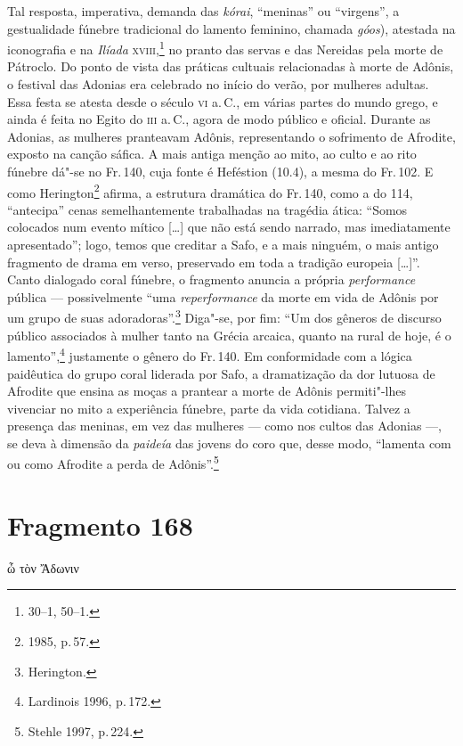 	
Tal resposta, imperativa, demanda das \emph{kórai}, ``meninas'' ou ``virgens'', a gestualidade fúnebre tradicional do lamento feminino, chamada \emph{góos}), atestada na iconografia e na \emph{Ilíada} \textsc{xviii},\footnote{30--1, 50--1.} no pranto das servas e das Nereidas pela morte de Pátroclo.
Do ponto de vista das práticas cultuais relacionadas à morte de Adônis, o festival das Adonias  
era celebrado no início do verão, por mulheres adultas. Essa festa se atesta 
desde o século \textsc{vi} a.\,C., em várias partes do
mundo grego, e ainda é feita no Egito do \textsc{iii} a.\,C., agora de modo público e
oficial. Durante as Adonias, as mulheres pranteavam Adônis, representando o
sofrimento de Afrodite, exposto na canção sáfica. A mais antiga
menção ao mito, ao culto e ao rito fúnebre dá"-se no Fr.\,140, cuja fonte é
Heféstion (10.4), a mesma do Fr.\,102. E como Herington\footnote{1985, p.\,57.} afirma, a estrutura dramática do Fr.\,140,  como a do 114, ``antecipa'' cenas semelhantemente trabalhadas na tragédia ática: ``Somos colocados num evento mítico [\ldots{}] que não está sendo narrado, mas imediatamente apresentado''; logo,  temos que creditar a Safo, e a mais ninguém, o mais antigo fragmento de drama em verso, preservado em toda a tradição europeia [\ldots{}]''. Canto dialogado coral fúnebre, o fragmento anuncia a própria \emph{performance} pública --- possivelmente ``uma \emph{reperformance} da morte em vida de Adônis por um grupo de suas adoradoras''.\footnote{Herington.} Diga"-se, por fim: ``Um dos gêneros de discurso público associados à mulher tanto na Grécia arcaica, quanto na rural de hoje, é o lamento'',\footnote{Lardinois 1996, p.\,172.} justamente o gênero do Fr.\,140. Em conformidade com a lógica
paidêutica do grupo coral liderada por Safo, a dramatização da dor lutuosa de Afrodite que ensina as moças a prantear a morte de Adônis permiti"-lhes vivenciar no mito a experiência fúnebre, parte da vida cotidiana. Talvez a presença das meninas, em vez das mulheres --- como nos cultos das Adonias ---, se deva à dimensão da \emph{paideía} das jovens do coro que, desse modo, ``lamenta com ou como Afrodite a perda de Adônis''.\footnote{Stehle 1997, p.\,224.}

\section{Fragmento 168}

\begin{gkverse}
ὦ τὸν Ἄδωνιν
\end{gkverse}

